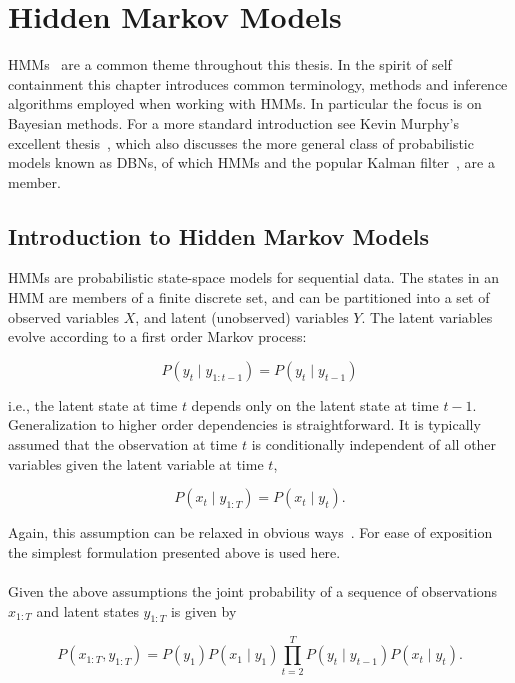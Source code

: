 \documentclass[12pt]{report}
\newcommand{\1}[0]{\mathbbm{1}}
\newcommand{\seq}[3]{\ensuremath{#1_{{#2}:{#3}}}}
\begin{document}
\chapter{Hidden Markov Models}
\label{chap: Hidden Markov Models}
\acp{HMM}~\cite{rabiner-hmms} are a common theme throughout this thesis.
In the spirit of self containment this chapter introduces common terminology,
methods and inference algorithms employed when working with \acp{HMM}. In particular
the focus is on Bayesian methods. For a more standard introduction see Kevin Murphy's
excellent thesis~\cite{murphy-thesis}, which also discusses the more general class of probabilistic models
known as \acp{DBN}, of which \acp{HMM} and the popular Kalman filter~\cite{kalman-filter}, are a member.

\section{Introduction to Hidden Markov Models}
\label{sec:Introduction to Hidden Markov Models}
\acp{HMM} are probabilistic state-space models for sequential data.
The states in an \ac{HMM} are members of a finite discrete set, and
can be partitioned into a set of observed variables $X$, and latent
(unobserved) variables $Y$. The latent variables evolve according to
a first order Markov process:

\[
    P(y_t \mid \seq{y}{1}{t-1}) = P(y_t \mid y_{t-1})
\]

i.e., the latent state at time $t$ depends only on the latent state
at time $t-1$. Generalization to higher order dependencies is straightforward.
It is typically assumed that the observation at time $t$ is conditionally
independent of all other variables given the latent variable at time $t$,

\[
    P(x_t \mid \seq{y}{1}{T}) = P(x_t \mid y_t).
\]

Again, this assumption can be relaxed in obvious ways~\cite{autoregressive-shannon}.
For ease of exposition the simplest formulation presented above is used here.
\\\\
Given the above assumptions the joint probability of a sequence of observations
$\seq{x}{1}{T}$ and latent states $\seq{y}{1}{T}$ is given by

\begin{equation}\label{eq:hmm-joint}
    P(\seq{x}{1}{T}, \seq{y}{1}{T}) =
    P(y_1)P(x_1 \mid y_1) \prod_{t=2}^T P(y_t \mid y_{t-1}) P(x_t \mid y_t).
\end{equation}
\end{document}
